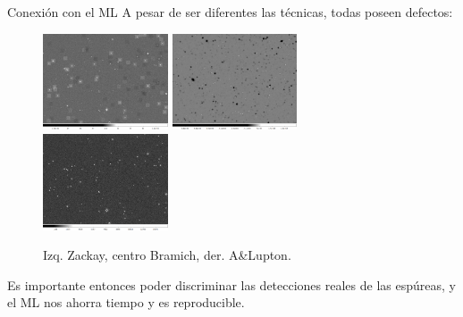 \documentclass[11pt]{beamer}
\begin{document}
\begin{frame}{Conexi\'on con el ML}
    A pesar de ser diferentes las t\'ecnicas, 
    todas poseen defectos:
    \begin{figure}
        \centering
        \includegraphics[width=0.33\textwidth]{images/diff.png}
        \includegraphics[width=0.33\textwidth]{images/diff_ois.png}
        \includegraphics[width=0.33\textwidth]{images/diff_hot.png}
        \caption{Izq. Zackay, centro Bramich, der. A\&Lupton.}
        \label{fig:restas}
    \end{figure}
    
    Es importante entonces poder discriminar las detecciones reales de las esp\'ureas,
    y el ML nos ahorra tiempo y es reproducible.
    \end{frame}
\end{document}
